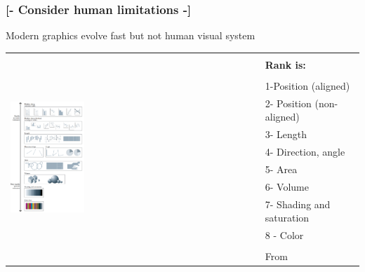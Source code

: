 \documentclass[xcolor=x11names,compress, aspectratio=169]{beamer}
\renewcommand{\(}{\begin{columns}}
\renewcommand{\)}{\end{columns}}
\newcommand{\<}[1]{\begin{column}{#1}}
\renewcommand{\>}{\end{column}}
\begin{document}
\begin{frame} %
\frametitle{\textcolor{brique}{[-  \textbf{Consider human limitations}   -]}}
\begin{center}
Modern graphics evolve fast but not  human visual system \\
\begin{tabular}{ll}
  \multirow{13}{*}{\includegraphics[width = 0.3\textwidth]{cleveland-McGill.png}}
                     & \\
                     & \textbf{Rank is:}\\
                     & \\
                     & 1-Position (aligned) \\
                     & 2- Position (non- aligned)\\
                     & 3- Length \\
                     & 4- Direction, angle \\
                     & 5- Area \\
                     & 6- Volume \\
                     & 7- Shading and saturation \\
                     & 8 - Color\\
                     & \\
                     & \hfill \textcolor{gris}{\footnotesize{From \cite{Cleveland1984}}} \\
  \end{tabular}
\end{center}
\end{frame}
\end{document}
